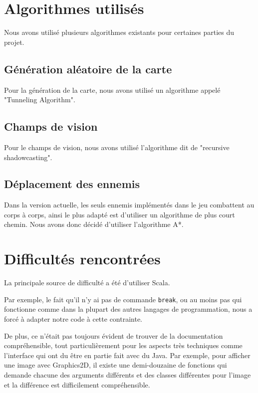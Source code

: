 \documentclass[10pt,a4paper]{article}
\begin{document}
\section{Algorithmes utilisés}

Nous avons utilisé plusieurs algorithmes existants pour certaines parties du projet. 

\subsection{Génération aléatoire de la carte}

Pour la génération de la carte, nous avons utilisé un algorithme appelé "Tunneling Algorithm".

\subsection{Champs de vision}

Pour le champs de vision, nous avons utilisé l'algorithme dit de "recursive shadowcasting".

\subsection{Déplacement des ennemis}

Dans la version actuelle, les seuls ennemis implémentés dans le jeu combattent au corps à corps, ainsi le plus adapté est d'utiliser un algorithme de plus court chemin. Nous avons donc décidé d'utiliser l'algorithme A*.

\section{Difficultés rencontrées}

La principale source de difficulté a été d'utiliser Scala.

Par exemple, le fait qu'il n'y ai pas de commande \texttt{break}, ou au moins pas qui fonctionne comme dans la plupart des autres langages de programmation, nous a forcé à adapter notre code à cette contrainte.

De plus, ce n'était pas toujours évident de trouver de la documentation compréhensible, tout particulièrement pour les aspects très techniques comme l'interface qui ont du être en partie fait avec du Java. Par exemple, pour afficher une image avec Graphics2D, il existe une demi-douzaine de fonctions qui demande chacune des arguments différents et des classes différentes pour l'image et la différence est difficilement compréhensible.
\end{document}
